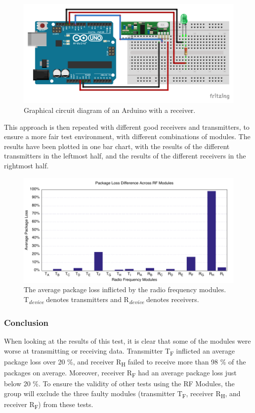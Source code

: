 \begin{figure}[h]
\centering
\includegraphics[width=\linewidth]{Figures/Fritzing/Receiver.pdf} 
\caption{Graphical circuit diagram of an Arduino with a receiver.}
\label{fig:Receiver}   
\end{figure}

This approach is then repeated with different good receivers and transmitters, to ensure a more fair test environment, with different combinations of modules.
The results have been plotted in one bar chart, with the results of the different transmitters in the leftmost half, and the results of the different receivers in the rightmost half.

\begin{figure}[H]
\centering
\includegraphics[width=\linewidth]{Figures/Graphs/diff_graph.pdf}
\centering
\caption{The average package loss inflicted by the radio frequency modules.\\ \textsf{T}\textsubscript{\textit{device}} denotes transmitters and \textsf{R}\textsubscript{\textit{device}} denotes receivers.}    
\label{fig:trans_diff}       
\end{figure} 

\subsubsection*{Conclusion}
When looking at the results of this test, it is clear that some of the modules were worse at transmitting or receiving data.
Transmitter \textsf{T\textsubscript{F}} inflicted an average package loss over 20 \%, and receiver \textsf{R\textsubscript{H}} failed to receive more than 98 \% of the packages on average.
Moreover, receiver \textsf{R\textsubscript{F}} had an average package loss just below 20 \%.
To ensure the validity of other tests using the RF Modules, the group will exclude the three faulty modules (transmitter \textsf{T\textsubscript{F}}, receiver \textsf{R\textsubscript{H}}, and receiver \textsf{R\textsubscript{F}}) from these tests.
